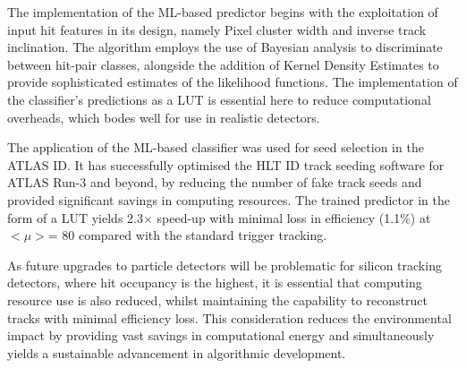The implementation of the ML-based predictor begins with the exploitation of input hit features in its design, namely Pixel cluster width and inverse track inclination. The algorithm employs the use of Bayesian analysis to discriminate between hit-pair classes, alongside the addition of Kernel Density Estimates to provide sophisticated estimates of the likelihood functions. The implementation of the classifier’s predictions as a LUT is essential here to reduce computational overheads, which bodes well for use in realistic detectors.

The application of the ML-based classifier was used for seed selection in the ATLAS ID. It has successfully optimised the HLT ID track seeding software for ATLAS Run-3 and beyond, by reducing the number of fake track seeds and provided significant savings in computing resources. The trained predictor in the form of a LUT yields 2.3$\times$ speed-up with minimal loss in efficiency (1.1\%) at $< \mu >$= 80 compared with the standard trigger tracking. 





As future upgrades to particle detectors will be problematic for silicon tracking detectors, where hit occupancy is the highest, it is essential that computing resource use is also reduced, whilst maintaining the capability to reconstruct tracks with minimal efficiency loss. This consideration reduces the environmental impact by providing vast savings in computational energy and simultaneously yields a sustainable advancement in algorithmic development.
